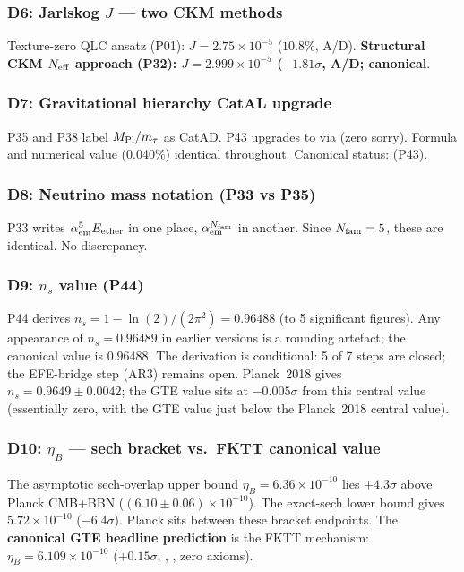 \subsubsection*{D6: Jarlskog $J$ — two CKM methods}

\noindent Texture-zero QLC ansatz (P01): $J = 2.75\times10^{-5}$ ($10.8\%$, A/D).
\textbf{Structural CKM $N_{\rm eff}$ approach (P32): $J = 2.999\times10^{-5}$ ($-1.81\sigma$, A/D; canonical}.

\subsubsection*{D7: Gravitational hierarchy CatAL upgrade}

\noindent P35 and P38 label $M_{\rm Pl}/m_\tau$ as CatAD.
P43 upgrades to \CatAL{} via  (zero sorry).
Formula and numerical value (0.040\%) identical throughout. Canonical status: \CatAL{} (P43).

\subsubsection*{D8: Neutrino mass notation (P33 vs P35)}

\noindent P33 writes $\alpha_{\rm em}^5 E_{\rm ether}$ in one place,
$\alpha_{\rm em}^{N_{\rm fam}}$ in another. Since $N_{\rm fam} = 5$, these are identical.
No discrepancy.

\subsubsection*{D9: $n_s$ value (P44)}

\noindent P44 derives $n_s = 1 - \ln(2)/(2\pi^2) = 0.96488$ (to 5 significant figures).
Any appearance of $n_s = 0.96489$ in earlier versions is a rounding artefact;
the canonical value is $\mathbf{0.96488}$.  The derivation is conditional: 5 of 7 steps
are closed; the EFE-bridge step (AR3) remains open.  Planck~2018 gives
$n_s = 0.9649 \pm 0.0042$; the GTE value sits at $-0.005\sigma$ from this central value (essentially zero, with the GTE value just below the Planck~2018 central value).

\subsubsection*{D10: $\eta_B$ — sech bracket vs.\ FKTT canonical value}

\noindent The asymptotic sech-overlap upper bound $\eta_B = 6.36\times10^{-10}$
lies $+4.3\sigma$ above Planck CMB+BBN ($(6.10\pm0.06)\times10^{-10}$).
The exact-sech lower bound gives $5.72\times10^{-10}$ ($-6.4\sigma$).
Planck sits between these bracket endpoints.
The \textbf{canonical GTE headline prediction} is the FKTT mechanism:
$\eta_B = 6.109\times10^{-10}$ ($+0.15\sigma$; \CatAL, ,
zero axioms).

